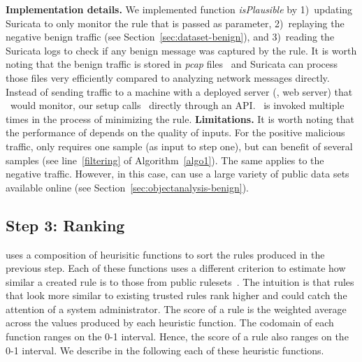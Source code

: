 \documentclass[sigconf,review, anonymous]{acmart}
\begin{document}

\textbf{Implementation details.} We implemented function
\emph{isPlausible} by 1)~updating Suricata to only monitor the rule
that is passed as parameter, 2)~replaying the negative benign traffic (see
Section~\ref{sec:dataset-benign}), and 3)~reading the Suricata logs to
check if any benign message was captured by the rule. It is worth
noting that the benign traffic is stored in \emph{pcap}
files~\cite{pcap} and Suricata can process those files very
efficiently compared to analyzing network messages directly. Instead
of sending traffic to a machine with a deployed server (\eg{}, web
server) that \suri\ would monitor, our setup calls \suri\ directly
through an API. \suri\ is invoked multiple times in the process of
minimizing the rule.  \textbf{Limitations.} It is worth noting that
the performance of \tname{} depends on the quality of inputs. For the
positive malicious traffic, \tname{} only requires one sample (as
input to step one), but can benefit of several samples (see
line~\ref{filtering} of Algorithm~\ref{algo1}). The same applies to
the negative traffic. However, in this case, \tname{} can use a large
variety of public data sets available online (see
Section~\ref{sec:objectanalysis-benign}).

\subsection{Step 3: Ranking}
\label{sec:ranking}

\tname{} uses a composition of heurisitic functions to sort the rules
produced in the previous step. Each of these functions uses a
different criterion to estimate how similar a created rule is to those
from public rulesets~\cite{emerging-threats-open}. The
intuition is that rules that look more similar to existing trusted
rules rank higher and could catch the attention of a system
administrator. The score of a rule is the weighted average across the
values produced by each heuristic function. The codomain of each
function ranges on the 0-1 interval. Hence, the score of a rule also
ranges on the 0-1 interval. We describe in the following each of these
heuristic functions.
\end{document}
